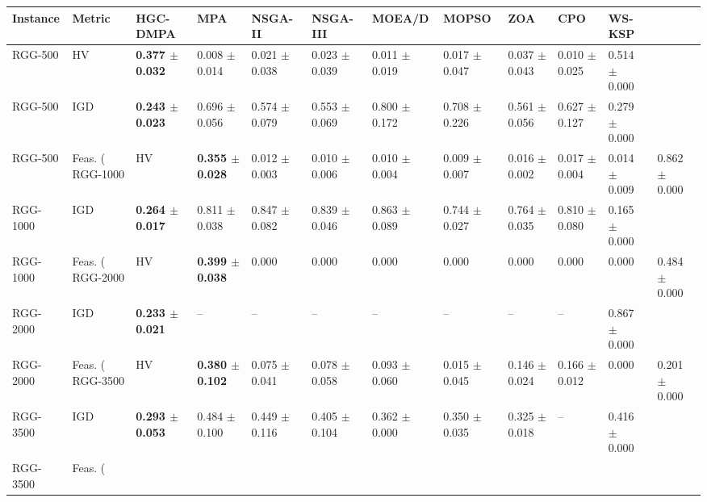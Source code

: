 \begin{tabular}{lllllllllll}
\toprule
Instance & Metric & HGC-DMPA & MPA & NSGA-II & NSGA-III & MOEA/D & MOPSO & ZOA & CPO & WS-KSP \\
\midrule
RGG-500 & HV & \textbf{0.377 $\pm$ 0.032} & 0.008 $\pm$ 0.014 & 0.021 $\pm$ 0.038 & 0.023 $\pm$ 0.039 & 0.011 $\pm$ 0.019 & 0.017 $\pm$ 0.047 & 0.037 $\pm$ 0.043 & 0.010 $\pm$ 0.025 & 0.514 $\pm$ 0.000 \\
RGG-500 & IGD & \textbf{0.243 $\pm$ 0.023} & 0.696 $\pm$ 0.056 & 0.574 $\pm$ 0.079 & 0.553 $\pm$ 0.069 & 0.800 $\pm$ 0.172 & 0.708 $\pm$ 0.226 & 0.561 $\pm$ 0.056 & 0.627 $\pm$ 0.127 & 0.279 $\pm$ 0.000 \\
RGG-500 & Feas. (%
RGG-1000 & HV & \textbf{0.355 $\pm$ 0.028} & 0.012 $\pm$ 0.003 & 0.010 $\pm$ 0.006 & 0.010 $\pm$ 0.004 & 0.009 $\pm$ 0.007 & 0.016 $\pm$ 0.002 & 0.017 $\pm$ 0.004 & 0.014 $\pm$ 0.009 & 0.862 $\pm$ 0.000 \\
RGG-1000 & IGD & \textbf{0.264 $\pm$ 0.017} & 0.811 $\pm$ 0.038 & 0.847 $\pm$ 0.082 & 0.839 $\pm$ 0.046 & 0.863 $\pm$ 0.089 & 0.744 $\pm$ 0.027 & 0.764 $\pm$ 0.035 & 0.810 $\pm$ 0.080 & 0.165 $\pm$ 0.000 \\
RGG-1000 & Feas. (%
RGG-2000 & HV & \textbf{0.399 $\pm$ 0.038} & 0.000 & 0.000 & 0.000 & 0.000 & 0.000 & 0.000 & 0.000 & 0.484 $\pm$ 0.000 \\
RGG-2000 & IGD & \textbf{0.233 $\pm$ 0.021} & -- & -- & -- & -- & -- & -- & -- & 0.867 $\pm$ 0.000 \\
RGG-2000 & Feas. (%
RGG-3500 & HV & \textbf{0.380 $\pm$ 0.102} & 0.075 $\pm$ 0.041 & 0.078 $\pm$ 0.058 & 0.093 $\pm$ 0.060 & 0.015 $\pm$ 0.045 & 0.146 $\pm$ 0.024 & 0.166 $\pm$ 0.012 & 0.000 & 0.201 $\pm$ 0.000 \\
RGG-3500 & IGD & \textbf{0.293 $\pm$ 0.053} & 0.484 $\pm$ 0.100 & 0.449 $\pm$ 0.116 & 0.405 $\pm$ 0.104 & 0.362 $\pm$ 0.000 & 0.350 $\pm$ 0.035 & 0.325 $\pm$ 0.018 & -- & 0.416 $\pm$ 0.000 \\
RGG-3500 & Feas. (%

\end{tabular}
